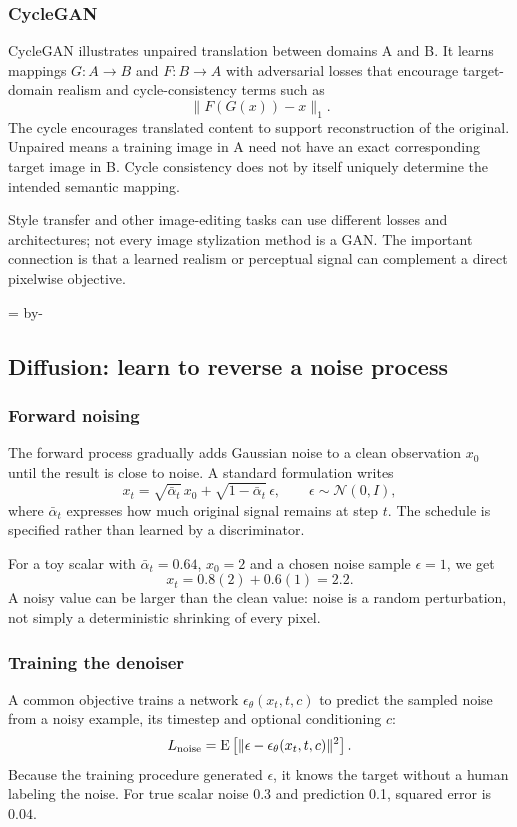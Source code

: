 \documentclass[11pt]{article}
\newcommand{\newsubsection}[1]{\par\begingroup\skip0=\pagegoal\advance\skip0 by-\pagetotal\ifdim\skip0<12\baselineskip\newpage\fi\endgroup\subsection{#1}}
\begin{document}
\subsubsection{CycleGAN}
CycleGAN illustrates unpaired translation between domains A and B. It learns mappings $G:A\to B$ and $F:B\to A$ with adversarial losses that encourage target-domain realism and cycle-consistency terms such as
\[
\|F(G(x))-x\|_1.
\]
The cycle encourages translated content to support reconstruction of the original. Unpaired means a training image in A need not have an exact corresponding target image in B. Cycle consistency does not by itself uniquely determine the intended semantic mapping.

Style transfer and other image-editing tasks can use different losses and architectures; not every image stylization method is a GAN. The important connection is that a learned realism or perceptual signal can complement a direct pixelwise objective.

\newsubsection{Diffusion: learn to reverse a noise process}
\subsubsection{Forward noising}
The forward process gradually adds Gaussian noise to a clean observation $x_0$ until the result is close to noise. A standard formulation writes
\[
x_t=\sqrt{\bar\alpha_t}\,x_0+
\sqrt{1-\bar\alpha_t}\,\epsilon,\qquad
\epsilon\sim\mathcal N(0,I),
\]
where $\bar\alpha_t$ expresses how much original signal remains at step $t$. The schedule is specified rather than learned by a discriminator.

For a toy scalar with $\bar\alpha_t=0.64$, $x_0=2$ and a chosen noise sample $\epsilon=1$, we get
\[
x_t=0.8(2)+0.6(1)=2.2.
\]
A noisy value can be larger than the clean value: noise is a random perturbation, not simply a deterministic shrinking of every pixel.

\subsubsection{Training the denoiser}
A common objective trains a network $\epsilon_\theta(x_t,t,c)$ to predict the sampled noise from a noisy example, its timestep and optional conditioning $c$:
\[
L_{\mathrm{noise}}=
\operatorname{E}\left[\|\epsilon-\epsilon_\theta(x_t,t,c)\|^2\right].
\]
Because the training procedure generated $\epsilon$, it knows the target without a human labeling the noise. For true scalar noise 0.3 and prediction 0.1, squared error is $0.04$.
\end{document}
